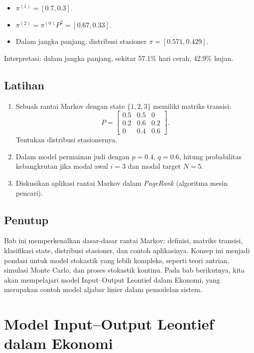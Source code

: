 \documentclass{bukumjh}
\begin{document}
\begin{itemize}
    \item $\pi^{(1)} = [0.7, 0.3]$.
    \item $\pi^{(2)} = \pi^{(0)} P^2 = [0.67, 0.33]$.
    \item Dalam jangka panjang, distribusi stasioner $\pi = [0.571, 0.429]$.
\end{itemize}

Interpretasi: dalam jangka panjang, sekitar 57.1\% hari cerah, 42.9\% hujan.

\section{Latihan}
\begin{enumerate}
    \item Sebuah rantai Markov dengan state $\{1,2,3\}$ memiliki matriks transisi:
    \[
    P = \begin{bmatrix}
    0.5 & 0.5 & 0 \\
    0.2 & 0.6 & 0.2 \\
    0 & 0.4 & 0.6
    \end{bmatrix}.
    \]
    Tentukan distribusi stasionernya.
    \item Dalam model permainan judi dengan $p=0.4$, $q=0.6$, hitung probabilitas kebangkrutan jika modal awal $i=3$ dan modal target $N=5$.
    \item Diskusikan aplikasi rantai Markov dalam \textit{PageRank} (algoritma mesin pencari).
\end{enumerate}

\section{Penutup}
Bab ini memperkenalkan dasar-dasar rantai Markov: definisi, matriks transisi, klasifikasi state, distribusi stasioner, dan contoh aplikasinya. Konsep ini menjadi pondasi untuk model stokastik yang lebih kompleks, seperti teori antrian, simulasi Monte Carlo, dan proses stokastik kontinu. Pada bab berikutnya, kita akan mempelajari {\jsg model Input–Output Leontief dalam Ekonomi}, yang merupakan contoh model aljabar linier dalam pemodelan sistem.



\chapter{Model Input–Output Leontief dalam Ekonomi}
\end{document}
